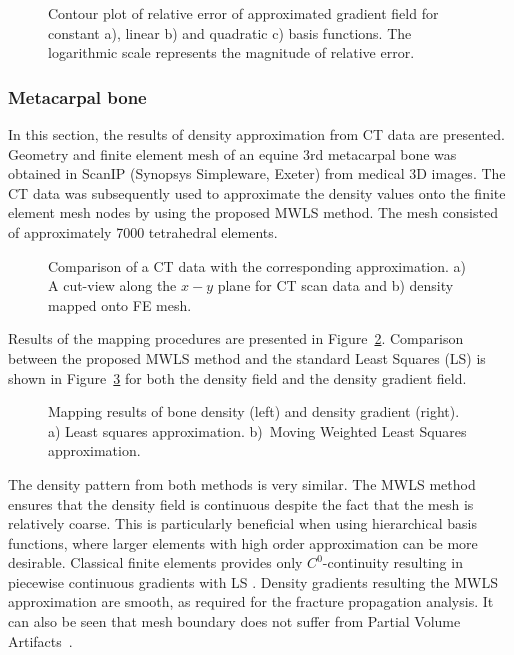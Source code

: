 \documentclass[review]{elsarticle}
\numberwithin{equation}{section}
\begin{document}
\begin{figure}[h!]
	\centering
		\def\svgwidth{14cm}
	
	\caption{Contour plot of relative error of approximated gradient field for constant a), linear b) and quadratic c) basis functions. The logarithmic scale represents the magnitude of relative error.}
	\label{fig:prism_error}
\end{figure}
\subsubsection{Metacarpal bone}
In this section, the results of density approximation from CT data are presented. Geometry and finite element mesh of an equine 3rd metacarpal bone was obtained in ScanIP (Synopsys Simpleware, Exeter) from medical 3D images. The CT data was subsequently used to approximate the density values onto the finite element mesh nodes by using the proposed MWLS method. 
The mesh consisted of approximately 7000 tetrahedral elements.
\begin{figure}
	\centering
	\def\svgwidth{10cm}
	
	\caption{Comparison of a CT data with the corresponding approximation. a) A cut-view along the $x-y$ plane for CT scan data and b) density mapped onto FE mesh.}
	\label{fig:mwlsmapping_cross}
\end{figure}
Results of the mapping procedures are presented in Figure~\ref{fig:mwlsmapping_cross}. Comparison between the proposed MWLS method and the standard Least Squares (LS) is shown in Figure~\ref{fig:mwlsmappingcomparisons} for both the density field and the density gradient field.
\begin{figure}[h!]
	\centering
		\def\svgwidth{12cm}
		
	\caption{Mapping results of bone density (left) and density gradient (right). a) Least squares approximation. b)~Moving Weighted Least Squares approximation.}
	\label{fig:mwlsmappingcomparisons}
\end{figure}
The density pattern from both methods is very similar. The MWLS method ensures that the density field is continuous despite the fact that the mesh is relatively coarse. 
This is particularly beneficial when using hierarchical basis functions, where larger elements with high order approximation can be more desirable. 
Classical finite elements provides only ${C^0}$-continuity resulting in piecewise continuous gradients with LS . 
Density gradients resulting the MWLS approximation are smooth, as required for the fracture propagation analysis.
It can also be seen that mesh boundary does not suffer from Partial Volume Artifacts~\citep{adams2009quantitative}.
\end{document}
